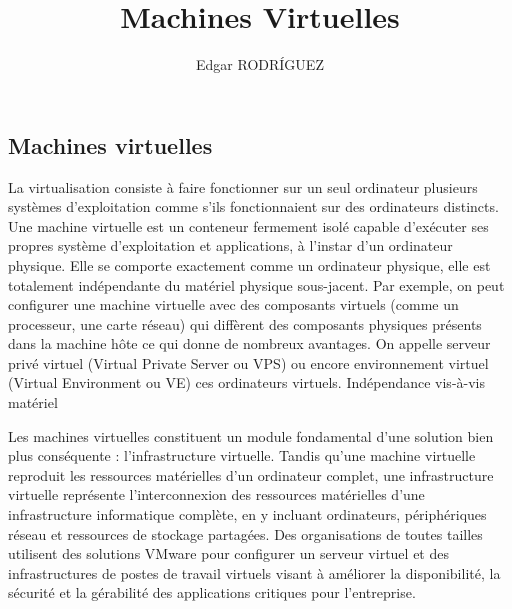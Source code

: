 \documentclass[a4paper,11pt]{report}
\title{Machines Virtuelles}
\author{Edgar RODRÍGUEZ}
\begin{document}
\maketitle

\subsection{Machines virtuelles}
La virtualisation consiste à faire fonctionner sur un seul ordinateur plusieurs
systèmes d'exploitation comme s'ils fonctionnaient sur des ordinateurs distincts.
Une machine virtuelle est un conteneur fermement isolé capable d’exécuter ses
propres système d’exploitation et applications, à l’instar d’un ordinateur physique.
Elle se comporte exactement comme un ordinateur physique, elle est totalement indépendante du matériel physique sous-jacent. Par exemple, on peut configurer une machine virtuelle avec des composants virtuels (comme un processeur, une carte réseau) qui diffèrent des composants physiques présents dans la machine hôte ce qui donne de nombreux avantages.
 On
appelle serveur privé virtuel (Virtual Private Server ou VPS) ou encore
environnement virtuel (Virtual Environment ou VE) ces ordinateurs virtuels.
Indépendance vis-à-vis matériel 


Les machines virtuelles constituent un module fondamental d’une solution bien plus conséquente : l'infrastructure virtuelle. Tandis qu’une machine virtuelle reproduit les ressources matérielles d’un ordinateur complet, une infrastructure virtuelle représente l’interconnexion des ressources matérielles d’une infrastructure informatique complète, en y incluant ordinateurs, périphériques réseau et ressources de stockage partagées. Des organisations de toutes tailles utilisent des solutions VMware pour configurer un serveur virtuel et des infrastructures de postes de travail virtuels visant à améliorer la disponibilité, la sécurité et la gérabilité des applications critiques pour l’entreprise. 
\end{document}
